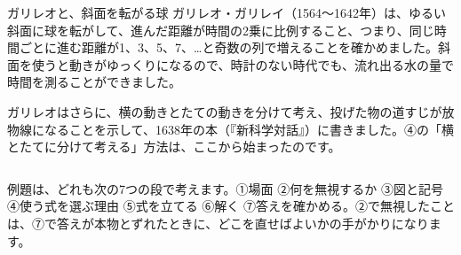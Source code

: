 \begin{column}{ガリレオと、斜面を転がる球}
ガリレオ・ガリレイ（1564〜1642年）は、ゆるい斜面に球を転がして、進んだ距離が時間の2乗に比例すること、つまり、同じ時間ごとに進む距離が1、3、5、7、…と奇数の列で増えることを確かめました。斜面を使うと動きがゆっくりになるので、時計のない時代でも、流れ出る水の量で時間を測ることができました。

ガリレオはさらに、横の動きとたての動きを分けて考え、投げた物の道すじが放物線になることを示して、1638年の本（『新科学対話』）に書きました。④の「横とたてに分けて考える」方法は、ここから始まったのです。
\end{column}


\begin{kotoba}\small
{}
\end{kotoba}


例題は、どれも次の7つの段で考えます。①場面 ②何を無視するか ③図と記号 ④使う式を選ぶ理由 ⑤式を立てる ⑥解く ⑦答えを確かめる。②で無視したことは、⑦で答えが本物とずれたときに、どこを直せばよいかの手がかりになります。

